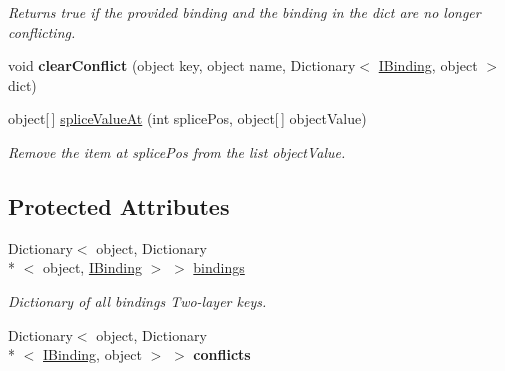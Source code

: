 \begin{DoxyCompactItemize}
\begin{DoxyCompactList}\small\item\em Returns true if the provided binding and the binding in the dict are no longer conflicting. \end{DoxyCompactList}\item 
\hypertarget{classstrange_1_1framework_1_1impl_1_1_binder_a1a426d227eeaa00823a744472c219698}{void {\bfseries clear\-Conflict} (object key, object name, Dictionary$<$ \hyperlink{interfacestrange_1_1framework_1_1api_1_1_i_binding}{I\-Binding}, object $>$ dict)}\label{classstrange_1_1framework_1_1impl_1_1_binder_a1a426d227eeaa00823a744472c219698}

\item 
\hypertarget{classstrange_1_1framework_1_1impl_1_1_binder_a349b12bdc879e7f465a7cf7dfeb3b5b4}{object\mbox{[}$\,$\mbox{]} \hyperlink{classstrange_1_1framework_1_1impl_1_1_binder_a349b12bdc879e7f465a7cf7dfeb3b5b4}{splice\-Value\-At} (int splice\-Pos, object\mbox{[}$\,$\mbox{]} object\-Value)}\label{classstrange_1_1framework_1_1impl_1_1_binder_a349b12bdc879e7f465a7cf7dfeb3b5b4}

\begin{DoxyCompactList}\small\item\em Remove the item at splice\-Pos from the list object\-Value. \end{DoxyCompactList}\end{DoxyCompactItemize}
\subsection*{Protected Attributes}
\begin{DoxyCompactItemize}
\item 
Dictionary$<$ object, Dictionary\\*
$<$ object, \hyperlink{interfacestrange_1_1framework_1_1api_1_1_i_binding}{I\-Binding} $>$ $>$ \hyperlink{classstrange_1_1framework_1_1impl_1_1_binder_a3b76e3cb4822c1f8732fd45fbd4d1802}{bindings}
\begin{DoxyCompactList}\small\item\em Dictionary of all bindings Two-\/layer keys. \end{DoxyCompactList}\item 
\hypertarget{classstrange_1_1framework_1_1impl_1_1_binder_a83af5663ac69ba271f18c03fdd9e21d2}{Dictionary$<$ object, Dictionary\\*
$<$ \hyperlink{interfacestrange_1_1framework_1_1api_1_1_i_binding}{I\-Binding}, object $>$ $>$ {\bfseries conflicts}}\label{classstrange_1_1framework_1_1impl_1_1_binder_a83af5663ac69ba271f18c03fdd9e21d2}

\end{DoxyCompactItemize}


